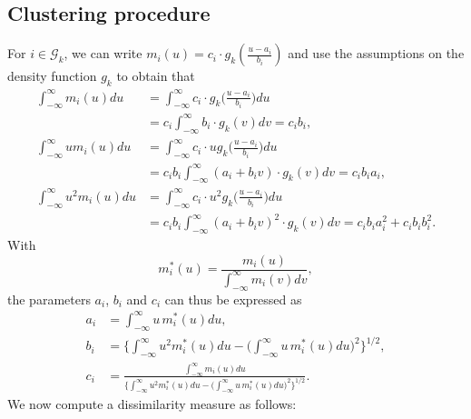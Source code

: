\documentclass[a4paper,12pt]{article}
\numberwithin{equation}{section}
\begin{document}
\subsection{Clustering procedure}


For $i \in \mathcal{G}_k$, we can write $m_i(u) = c_i \cdot g_k(\frac{u - a_i}{b_i})$ and use the assumptions on the density function $g_k$ to obtain that
\begin{align*}
\int_{-\infty}^\infty m_i(u) du &= \int_{-\infty}^\infty c_i \cdot g_k\Big(\frac{u - a_i}{b_i}\Big) du \nonumber\\
&= c_i \int_{-\infty}^\infty b_i \cdot g_k(v) dv = c_i b_i, \nonumber\\
\int_{-\infty}^\infty u m_i(u) du &= \int_{-\infty}^\infty c_i \cdot u g_k\Big(\frac{u - a_i}{b_i}\Big) du \nonumber\\
&= c_i b_i \int_{-\infty}^\infty (a_i + b_i v) \cdot g_k(v) dv = c_i b_i a_i, \\
\int_{-\infty}^\infty u^2 m_i(u) du &= \int_{-\infty}^\infty c_i \cdot u^2 g_k\Big(\frac{u - a_i}{b_i}\Big) du \nonumber\\
&= c_i b_i \int_{-\infty}^\infty (a_i + b_i v)^2 \cdot g_k(v) dv = c_i b_i a_i^2+ c_i b_i b_i^2.\nonumber
\end{align*}
With 
$$m_i^*(u) = \frac{m_i(u)}{\int_{-\infty}^\infty m_i(v)dv},$$
the parameters $a_i$, $b_i$ and $c_i$ can thus be expressed as
\begin{align*}
a_i &= \int_{-\infty}^\infty u \, m_i^*(u) du, \\
b_i &= \bigg\{ \int_{-\infty}^\infty u^2 m_i^*(u) du  - \Big(\int_{-\infty}^\infty u\, m_i^*(u) du \Big)^2 \bigg\}^{1/2}, \\
c_i & = \frac{\int_{-\infty}^\infty m_i(u) du}{\Big\{ \int_{-\infty}^\infty u^2 m_i^*(u) du  - \Big(\int_{-\infty}^\infty u \,m_i^*(u) du \Big)^2 \Big\}^{1/2}}.
\end{align*}
We now compute a dissimilarity measure as follows:
\end{document}
